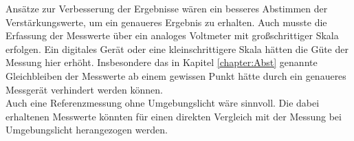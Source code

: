 Ansätze zur Verbesserung der Ergebnisse wären ein besseres Abstimmen der Verstärkungswerte, um ein
genaueres Ergebnis zu erhalten. Auch musste die Erfassung der Messwerte über ein analoges
Voltmeter mit großschrittiger Skala erfolgen. Ein digitales Gerät oder eine kleinschrittigere
Skala hätten die Güte der Messung hier erhöht. Insbesondere das in Kapitel \ref{chapter:Abst}
genannte Gleichbleiben der Messwerte ab einem gewissen Punkt hätte durch ein genaueres
Messgerät verhindert werden können.\\
Auch eine Referenzmessung ohne Umgebungslicht wäre sinnvoll. Die dabei erhaltenen
Messwerte könnten für einen direkten Vergleich mit der Messung bei Umgebungslicht herangezogen werden.

\newpage
\nocite{*}
\printbibliography
